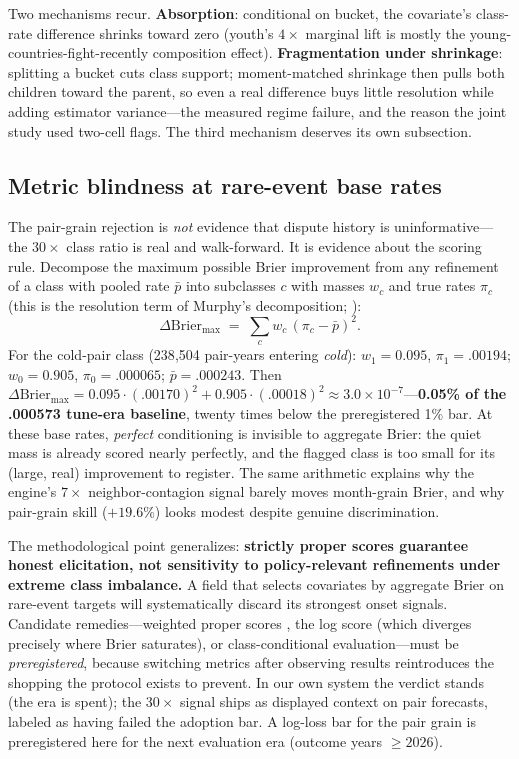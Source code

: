 \documentclass[11pt]{article}
\newcommand{\brier}{\mathrm{Brier}}
\begin{document}
Two mechanisms recur. \textbf{Absorption}: conditional on bucket, the
covariate's class-rate difference shrinks toward zero (youth's $4\times$
marginal lift is mostly the young-countries-fight-recently composition
effect). \textbf{Fragmentation under shrinkage}: splitting a bucket cuts
class support; moment-matched shrinkage then pulls both children toward the
parent, so even a real difference buys little resolution while adding
estimator variance---the measured regime failure, and the reason the joint
study used two-cell flags. The third mechanism deserves its own subsection.

\subsection{Metric blindness at rare-event base rates}\label{sec:blindness}

The pair-grain rejection is \emph{not} evidence that dispute history is
uninformative---the $30\times$ class ratio is real and walk-forward. It is
evidence about the scoring rule. Decompose the maximum possible Brier
improvement from any refinement of a class with pooled rate $\bar p$ into
subclasses $c$ with masses $w_c$ and true rates $\pi_c$ (this is the
resolution term of Murphy's decomposition; \citealp{murphy1973new}):
\begin{equation}
\Delta\brier_{\max} \;=\; \sum_c w_c\,(\pi_c - \bar p)^2 .
\label{eq:blindness}
\end{equation}
For the cold-pair class (238{,}504 pair-years entering \emph{cold}):
$w_1 = 0.095$, $\pi_1 = .00194$; $w_0 = 0.905$, $\pi_0 = .000065$;
$\bar p = .000243$. Then $\Delta\brier_{\max} = 0.095 \cdot (.00170)^2 +
0.905 \cdot (.00018)^2 \approx 3.0 \times 10^{-7}$---\textbf{0.05\% of the
.000573 tune-era baseline}, twenty times below the preregistered 1\% bar. At
these base rates, \emph{perfect} conditioning is invisible to aggregate
Brier: the quiet mass is already scored nearly perfectly, and the flagged
class is too small for its (large, real) improvement to register. The same
arithmetic explains why the engine's $7\times$ neighbor-contagion signal
barely moves month-grain Brier, and why pair-grain skill ($+19.6\%$) looks
modest despite genuine discrimination.

The methodological point generalizes: \textbf{strictly proper scores
guarantee honest elicitation, not sensitivity to policy-relevant refinements
under extreme class imbalance.} A field that selects covariates by aggregate
Brier on rare-event targets will systematically discard its strongest onset
signals. Candidate remedies---weighted proper scores
\citep{ferro2011extremal}, the log score (which diverges precisely where
Brier saturates), or class-conditional evaluation---must be
\emph{preregistered}, because switching metrics after observing results
reintroduces the shopping the protocol exists to prevent. In our own system
the verdict stands (the era is spent); the $30\times$ signal ships as
displayed context on pair forecasts, labeled as having failed the adoption
bar. A log-loss bar for the pair grain is preregistered here for the next
evaluation era (outcome years ${\geq}2026$).
\end{document}
